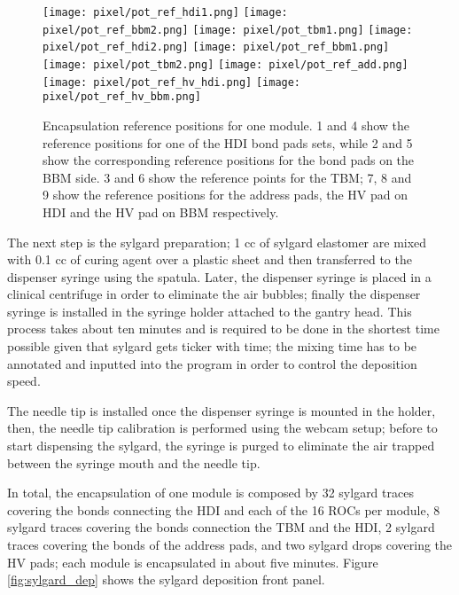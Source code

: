 \begin{figure}[h]
\begin{center}
  \texttt{[image: pixel/pot\_ref\_hdi1.png]}
  \texttt{[image: pixel/pot\_ref\_bbm2.png]}
  \texttt{[image: pixel/pot\_tbm1.png]}
  \texttt{[image: pixel/pot\_ref\_hdi2.png]}
  \texttt{[image: pixel/pot\_ref\_bbm1.png]}
  \texttt{[image: pixel/pot\_tbm2.png]}
  \texttt{[image: pixel/pot\_ref\_add.png]}
  \texttt{[image: pixel/pot\_ref\_hv\_hdi.png]}
  \texttt{[image: pixel/pot\_ref\_hv\_bbm.png]}
 \caption[Encapsulation reference positions.]{Encapsulation reference positions for one module. 1 and 4 show the reference positions for one of the HDI bond pads sets, while 2 and 5 show the corresponding reference positions for the bond pads on the BBM side. 3 and 6 show the reference points for the TBM; 7, 8 and 9 show the reference positions for the address pads, the HV pad on HDI and the HV pad on BBM respectively.}\label{fig:potting_references}
\end{center}
\end{figure}

The next step is the sylgard preparation; 1 cc of sylgard elastomer are mixed with 0.1 cc of curing agent over a plastic sheet and then transferred to the dispenser syringe using the spatula. Later, the dispenser syringe is placed in a clinical centrifuge in order to eliminate the air bubbles; finally the dispenser syringe is installed in the syringe holder attached to the gantry head. This process takes about ten minutes and is required to be done in the shortest time possible given that sylgard gets ticker with time; the mixing time has to be annotated and inputted into the program in order to control the deposition speed.

The needle tip is installed once the dispenser syringe is mounted in the holder, then, the needle tip calibration is performed using the webcam setup; before to start dispensing the sylgard, the syringe is purged to eliminate the air trapped between the syringe mouth and the needle tip.

In total, the encapsulation of one module is composed by 32 sylgard traces covering the bonds connecting the HDI and each of the 16 ROCs per module, 8 sylgard traces covering the bonds connection the TBM and the HDI, 2 sylgard traces covering the bonds of the address pads, and two sylgard drops covering the HV pads; each module is encapsulated in about five minutes. Figure \ref{fig:sylgard_dep} shows the sylgard deposition front panel. 

